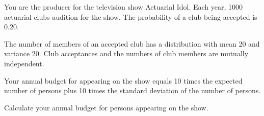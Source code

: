 You are the producer for the television show Actuarial Idol. Each year, 1000 actuarial clubs audition for the show. The probability of a club being accepted is 0.20. 

\smallskip
The number of members of an accepted club has a distribution with mean 20 and variance 20. Club acceptances and the numbers of club members are mutually independent. 

\smallskip
Your annual budget for appearing on the show equals 10 times the expected number of persons plus 10 times the standard deviation of the number of persons. 

\smallskip
Calculate your annual budget for persons appearing on the show. 



